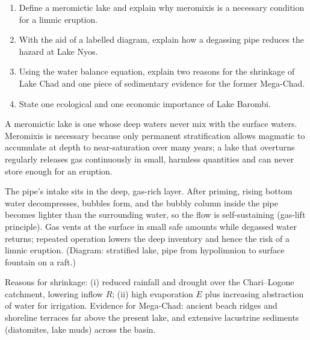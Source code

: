\documentclass[11pt]{article}
\begin{document}
\begin{exercice}
\begin{enumerate}
\item Define a meromictic lake and explain why meromixis is a necessary condition for a limnic eruption.
\item With the aid of a labelled diagram, explain how a degassing pipe reduces the hazard at Lake Nyos.
\item Using the water balance equation, explain two reasons for the shrinkage of Lake Chad and one piece of sedimentary evidence for the former Mega-Chad.
\item State one ecological and one economic importance of Lake Barombi.
\end{enumerate}
\end{exercice}

\begin{corrige}[Exercise 1]
A meromictic lake is one whose deep waters never mix with the surface waters. Meromixis is necessary because only permanent stratification allows magmatic  to accumulate at depth to near-saturation over many years; a lake that overturns regularly releases gas continuously in small, harmless quantities and can never store enough for an eruption.
\end{corrige}

\begin{corrige}[Exercise 2]
The pipe's intake sits in the deep, gas-rich layer. After priming, rising bottom water decompresses,  bubbles form, and the bubbly column inside the pipe becomes lighter than the surrounding water, so the flow is self-sustaining (gas-lift principle). Gas vents at the surface in small safe amounts while degassed water returns; repeated operation lowers the deep  inventory and hence the risk of a limnic eruption. (Diagram: stratified lake, pipe from hypolimnion to surface fountain on a raft.)
\end{corrige}

\begin{corrige}[Exercise 3]
Reasons for shrinkage: (i) reduced rainfall and drought over the Chari--Logone catchment, lowering inflow $R$; (ii) high evaporation $E$ plus increasing abstraction of water for irrigation. Evidence for Mega-Chad: ancient beach ridges and shoreline terraces far above the present lake, and extensive lacustrine sediments (diatomites, lake muds) across the basin.
\end{corrige}
\end{document}
